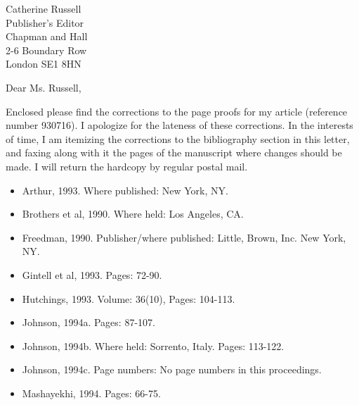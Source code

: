



\signature {Philip Johnson \\Assistant Professor}

\address{548 Kaimake Loop\\
         Kailua, HI 96734}

\indentclosing

\begin {letter}
  {Catherine Russell\\
   Publisher's Editor\\
   Chapman and Hall\\
   2-6 Boundary Row \\
   London SE1 8HN}

\opening {Dear Ms. Russell,}

Enclosed please find the corrections to the page proofs for my article
(reference number 930716).  I apologize for the lateness of these
corrections.  In the interests of time, I am itemizing the corrections to
the bibliography section in this letter, and faxing along with it the
pages of the manuscript where changes should be made.  I will return the
hardcopy by regular postal mail.

\begin{itemize}
\item Arthur, 1993.  Where published: New York, NY.
\item Brothers et al, 1990.  Where held: Los Angeles, CA.
\item Freedman, 1990. Publisher/where published: Little, Brown, Inc. New
York, NY.
\item Gintell et al, 1993. Pages: 72-90.
\item Hutchings, 1993.  Volume: 36(10), Pages: 104-113.
\item Johnson, 1994a.   Pages: 87-107.
\item Johnson, 1994b.  Where held: Sorrento, Italy.  Pages: 113-122.
\item Johnson, 1994c. Page numbers: No page numbers in this proceedings.
\item Mashayekhi, 1994. Pages: 66-75.
\end{itemize}


\end{letter}
